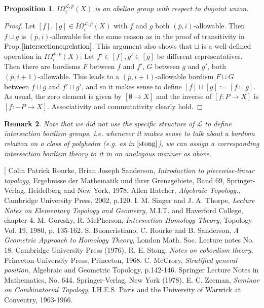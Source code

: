 \documentclass{scrreprt}
\newtheorem{prop}{Proposition}[chapter]
\newtheorem{remark}[prop]{Remark}
\begin{document}
\begin{prop}
$I \Omega_i^{\mathcal{L}, \overline{p}}(X) $ is an abelian group with respect to disjoint union.
\end{prop}

\begin{proof}
Let $[f],[g] \in I \Omega_i^{\mathcal{L}, \overline{p}}(X) $ with $f$ and $g$ both $(\overline{p},i)$-allowable. Then $f \sqcup g$ is $(\overline{p},i)$-allowable for the same reason as in the proof of transitivity in Prop.$\ref{intersectioneqrelation}$. This argument also shows that $\sqcup$ is a well-defined operation in $I \Omega_i^{\mathcal{L}, \overline{p}}(X)$: Let $f' \in [f],g' \in [g]$ be different representatives. Then there are bordisms $F$ between $f$ and $f'$, $G$ between $g$ and $g'$, both $(\overline{p},i+1)$-allowable. This leads to a $(\overline{p},i+1)$-allowable bordism $F \sqcup G$ between $f \sqcup g$ and $f' \sqcup g'$, and so it makes sense to define $[f] \sqcup [g]:=[f \sqcup g]$. As usual, the zero element is given by $[\emptyset \to X]$ and the inverse of $[f: P \to X]$ is $[f: -P \to X]$. Associativity and commutativity clearly hold.
\end{proof}

\begin{remark}
Note that we did not use the specific structure of $\mathcal{L}$ to define intersection bordism groups, i.e. whenever it makes sense to talk about a bordism relation on a class of polyhedra (e.g. as in $\cite{stong}$), we can assign a corresponding intersection bordism theory to it in an analogous manner as above. 
\end{remark}



\begin{thebibliography}[
Colin Patrick Rourke, Brian Joseph Sanderson, \textit{Introduction to piecewise-linear topology}, Ergebnisse der Mathematik und ihrer Grenzgebiete, Band 69, Springer-Verlag, Heidelberg and New York, 1978.
Allen Hatcher, \textit{Algebraic Topology.}, Cambridge University Press, 2002, p.120.
I. M. Singer and J. A. Thorpe, \textit{Lecture Notes on Elementary Topology and Geometry}, M.I.T. and Haverford College, chapter 4.
M. Goresky, R. McPherson, \textit{Intersection Homology Theory}, Topology Vol. 19, 1980, p. 135-162.
S. Buoncristiano, C. Rourke and B. Sanderson, \textit{A Geometric Approach to Homology Theory}, London Math. Soc. Lecture notes No. 18. Cambridge University Press (1976).
R. E. Stong, \textit{Notes on cobordism theory}, Princeton University Press, Princeton, 1968.
C. McCrory, \textit{Stratified general position}, Algebraic and Geometric Topology, p.142-146. Springer Lecture Notes in Mathematics, No. 644. Springer-Verlag, New York (1978).
E. C. Zeeman, \textit{Seminar on Combinatorial Topology}, I.H.E.S. Paris and the University of Warwick at Conventry, 1963-1966.
\end{thebibliography}
\end{document}
